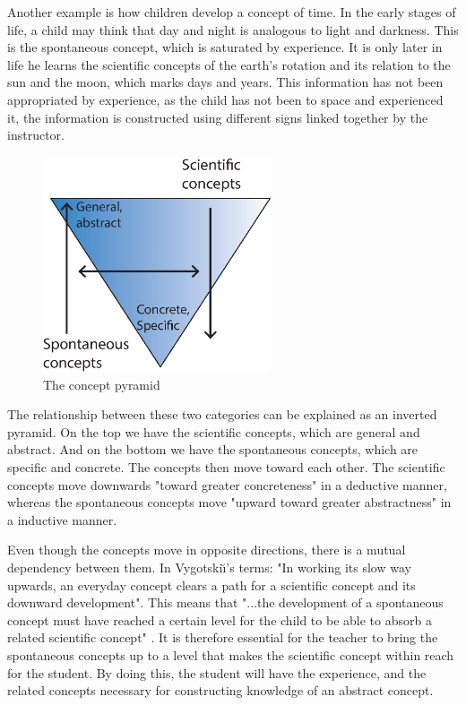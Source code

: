 Another example is how children develop a concept of time. In the early stages of life, a child may think that day and night is analogous to light and darkness. This is the spontaneous concept, which is saturated by experience. It is only later in life he learns the scientific concepts of the earth's rotation and its relation to the sun and the moon, which marks days and years. This information has not been appropriated by experience, as the child has not been to space and experienced it, the information is constructed using different signs linked together by the instructor. 

\begin{figure}
\centering
\includegraphics[width=0.6\textwidth]{img/theoretical/conceptpyramid.eps}
\caption{The concept pyramid}
\label{fig:conceptpyramid}
\end{figure}

The relationship between these two categories can be explained as an inverted pyramid. On the top we have the scientific concepts, which are general and abstract. And on the bottom we have the spontaneous concepts, which are specific and concrete. The concepts then move toward each other. The scientific concepts move downwards "toward greater concreteness" in a deductive manner, whereas the spontaneous concepts move "upward toward greater abstractness" \citep{vygotsky2012thought} in a inductive manner.

Even though the concepts move in opposite directions, there is a mutual dependency between them. In Vygotski{\u\i}'s terms: "In working its slow way upwards, an everyday concept clears a path for a scientific concept and its downward development". This means that "...the development of a spontaneous concept must have reached a certain level for the child to be able to absorb a related scientific concept" \citep[p. 194]{vygotsky2012thought}. It is therefore essential for the teacher to bring the spontaneous concepts up to a level that makes the scientific concept within reach for the student. By doing this, the student will have the experience, and the related concepts necessary for constructing knowledge of an abstract concept. 


